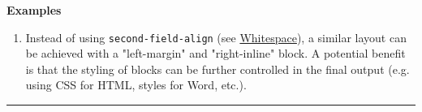 \textbf{Examples}

\begin{enumerate}
\def\labelenumi{(\Alph{enumi})}
\item
  Instead of using \texttt{second-field-align} (see
  \protect\hyperlink{whitespace}{Whitespace}), a similar layout can be
  achieved with a "left-margin" and "right-inline" block. A potential
  benefit is that the styling of blocks can be further controlled in the
  final output (e.g. using CSS for HTML, styles for Word, etc.).

\begin{Shaded}
\begin{Highlighting}[]
\NormalTok{\textless{}}\NormalTok{\textgreater{}}
\NormalTok{  \textless{}}\NormalTok{\textgreater{}}
\NormalTok{    \textless{}}
\StringTok{"["}\StringTok{"]"}\NormalTok{/\textgreater{}}
\NormalTok{    \textless{}}\NormalTok{\textgreater{}}
\NormalTok{    \textless{}/}\NormalTok{\textgreater{}}
\NormalTok{  \textless{}/}\NormalTok{\textgreater{}}
\NormalTok{\textless{}/}\NormalTok{\textgreater{}}
\end{Highlighting}
\end{Shaded}
\end{enumerate}

\begin{center}\rule{0.5\linewidth}{0.5pt}\end{center}


